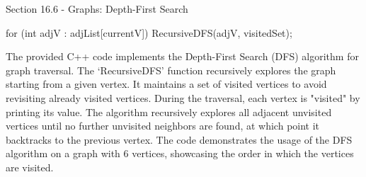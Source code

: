 \begin{notes}{Section 16.6 - Graphs: Depth-First Search}
\begin{highlight}
\begin{code}[C++]
{{            for (int adjV : adjList[currentV]) {
                RecursiveDFS(adjV, visitedSet);
            }
        }
    }
    \end{code}
        The provided C++ code implements the Depth-First Search (DFS) algorithm for graph traversal. The `RecursiveDFS' function recursively explores the graph starting from a given vertex. It maintains a 
        set of visited vertices to avoid revisiting already visited vertices. During the traversal, each vertex is "visited" by printing its value. The algorithm recursively explores all adjacent unvisited 
        vertices until no further unvisited neighbors are found, at which point it backtracks to the previous vertex. The code demonstrates the usage of the DFS algorithm on a graph with 6 vertices, showcasing 
        the order in which the vertices are visited.
    \end{highlight}
\end{notes}

